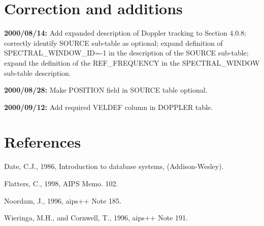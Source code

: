 \documentclass{article}
\begin{document}
\section{Correction and additions}

\begin{description}

\item{{\bf 2000/08/14:} Add expanded description of Doppler tracking to
Section 4.0.8; correctly identify SOURCE sub-table as optional; expand
definition of SPECTRAL\_WINDOW\_ID=-1 in the description of the SOURCE
sub-table; expand the definition of the REF\_FREQUENCY in the
SPECTRAL\_WINDOW sub-table description.}
\item{{\bf 2000/08/28:} Make POSITION field in SOURCE table optional.}
\item{{\bf 2000/09/12:} Add required VELDEF column in DOPPLER table.}

\end{description}

\section{References}

\noindent Date, C.J., 1986, Introduction to database systems, (Addison-Wesley).

\noindent Flatters, C., 1998, AIPS Memo. 102.

\noindent Noordam, J., 1996, aips++ Note 185.

\noindent Wieringa, M.H., and Cornwell, T., 1996, aips++ Note 191.
\end{document}
